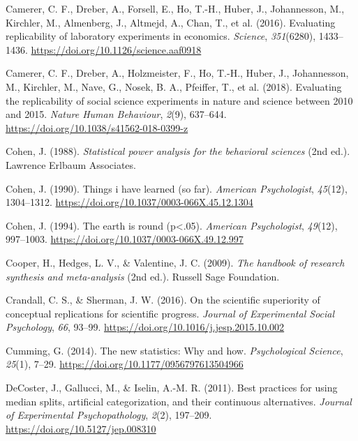\documentclass[
]{interact}
\newlength{\cslhangindent}
\newlength{\cslentryspacingunit} %
\newenvironment{CSLReferences}[2] %
    {%
  \setlength{\parindent}{0pt}
  \ifodd #1
  \let\oldpar\par
  \def\par{\hangindent=\cslhangindent\oldpar}
  \fi
  \setlength{\parskip}{#2\cslentryspacingunit}
 }%
 {}
\begin{document}
\begin{CSLReferences}{1}{0}
\leavevmode{}%
Camerer, C. F., Dreber, A., Forsell, E., Ho, T.-H., Huber, J.,
Johannesson, M., Kirchler, M., Almenberg, J., Altmejd, A., Chan, T., et
al. (2016). Evaluating replicability of laboratory experiments in
economics. \emph{Science}, \emph{351}(6280), 1433--1436.
\url{https://doi.org/10.1126/science.aaf0918}

\leavevmode{}%
Camerer, C. F., Dreber, A., Holzmeister, F., Ho, T.-H., Huber, J.,
Johannesson, M., Kirchler, M., Nave, G., Nosek, B. A., Pfeiffer, T., et
al. (2018). Evaluating the replicability of social science experiments
in nature and science between 2010 and 2015. \emph{Nature Human
Behaviour}, \emph{2}(9), 637--644.
\url{https://doi.org/10.1038/s41562-018-0399-z}

\leavevmode{}%
Cohen, J. (1988). \emph{Statistical power analysis for the behavioral
sciences} (2nd ed.). Lawrence Erlbaum Associates.

\leavevmode{}%
Cohen, J. (1990). Things i have learned (so far). \emph{American
Psychologist}, \emph{45}(12), 1304--1312.
\url{https://doi.org/10.1037/0003-066X.45.12.1304}

\leavevmode{}%
Cohen, J. (1994). The earth is round
(p{\enspace}\textless{}{\enspace}.05). \emph{American Psychologist},
\emph{49}(12), 997--1003.
\url{https://doi.org/10.1037/0003-066X.49.12.997}

\leavevmode{}%
Cooper, H., Hedges, L. V., \& Valentine, J. C. (2009). \emph{The
handbook of research synthesis and meta-analysis} (2nd ed.). Russell
Sage Foundation.

\leavevmode{}%
Crandall, C. S., \& Sherman, J. W. (2016). On the scientific superiority
of conceptual replications for scientific progress. \emph{Journal of
Experimental Social Psychology}, \emph{66}, 93--99.
\url{https://doi.org/10.1016/j.jesp.2015.10.002}

\leavevmode{}%
Cumming, G. (2014). The new statistics: Why and how. \emph{Psychological
Science}, \emph{25}(1), 7--29.
\url{https://doi.org/10.1177/0956797613504966}

\leavevmode{}%
DeCoster, J., Gallucci, M., \& Iselin, A.-M. R. (2011). Best practices
for using median splits, artificial categorization, and their continuous
alternatives. \emph{Journal of Experimental Psychopathology},
\emph{2}(2), 197--209. \url{https://doi.org/10.5127/jep.008310}


\end{CSLReferences}
\end{document}
